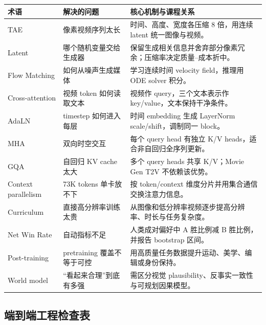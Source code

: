 \documentclass[a4paper]{article}
\begin{document}
\begin{center}
\small
\begin{tabularx}{\textwidth}{p{} X X}
\toprule
\textbf{术语} & \textbf{解决的问题} & \textbf{核心机制与课程关系} \\
\midrule
TAE & 像素视频序列太长 & 时间、高度、宽度各压缩 8 倍，用连续 latent 统一图像与视频。 \\
Latent & 哪个随机变量交给生成器 & 保留生成相关信息并舍弃部分像素冗余；压缩率决定质量--成本折中。 \\
Flow Matching & 如何从噪声生成媒体 & 学习连续时间 velocity field，推理用 ODE solver 积分。 \\
Cross-attention & 视频 token 如何读取文本 & 视频作 query，三个文本表示作 key/value，文本保持干净条件。 \\
AdaLN & timestep 如何进入每层 & 时间 embedding 生成 LayerNorm scale/shift，调制同一 block。 \\
MHA & 双向时空交互 & 每个 query head 有独立 K/V heads，适合非自回归全序列更新。 \\
GQA & 自回归 KV cache 太大 & 多个 query heads 共享 K/V；Movie Gen T2V 不依赖该优势。 \\
Context parallelism & 73K tokens 单卡放不下 & 按 token/context 维度分片并用集合通信交换注意力信息。 \\
Curriculum & 直接高分辨率训练太贵 & 从图像和低分辨率视频逐步提高分辨率、时长与任务复杂度。 \\
Net Win Rate & 自动指标不足 & 人类成对偏好中 A 胜比例减 B 胜比例，并报告 bootstrap 区间。 \\
Post-training & pretraining 覆盖不等于可控 & 用高质量任务数据提升运动、美学、编辑或身份保持。 \\
World model & “看起来合理”到底有多强 & 需区分视觉 plausibility、反事实一致性与可规划因果模型。 \\
\bottomrule
\end{tabularx}
\end{center}

\subsection{端到端工程检查表}
\end{document}
